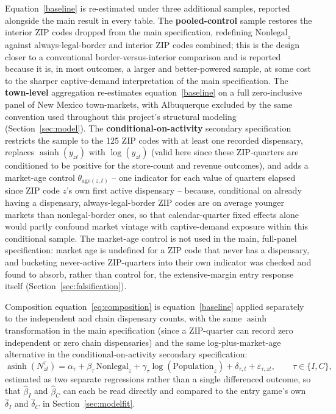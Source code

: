 \documentclass[english,12pt]{article}
\begin{document}
Equation~\eqref{baseline} is re-estimated under three additional samples, reported alongside the main result in every table. The \textbf{pooled-control} sample restores the interior ZIP codes dropped from the main specification, redefining $\text{Nonlegal}_z$ against always-legal-border and interior ZIP codes combined; this is the design closer to a conventional border-versus-interior comparison and is reported because it is, in most outcomes, a larger and better-powered sample, at some cost to the sharper captive-demand interpretation of the main specification. The \textbf{town-level} aggregation re-estimates equation~\eqref{baseline} on a full zero-inclusive panel of New Mexico town-markets, with Albuquerque excluded by the same convention used throughout this project's structural modeling (Section~\ref{sec:model}). The \textbf{conditional-on-activity} secondary specification restricts the sample to the 125 ZIP codes with at least one recorded dispensary, replaces $\operatorname{asinh}(y_{zt})$ with $\log(y_{zt})$ (valid here since these ZIP-quarters are conditioned to be positive for the store-count and revenue outcomes), and adds a market-age control $\theta_{\text{age}(z,t)}$ -- one indicator for each value of quarters elapsed since ZIP code $z$'s own first active dispensary -- because, conditional on already having a dispensary, always-legal-border ZIP codes are on average younger markets than nonlegal-border ones, so that calendar-quarter fixed effects alone would partly confound market vintage with captive-demand exposure within this conditional sample. The market-age control is not used in the main, full-panel specification: market age is undefined for a ZIP code that never has a dispensary, and bucketing never-active ZIP-quarters into their own indicator was checked and found to absorb, rather than control for, the extensive-margin entry response itself (Section~\ref{sec:falsification}).

Composition equation~\eqref{eq:composition} is equation~\eqref{baseline} applied separately to the independent and chain dispensary counts, with the same $\operatorname{asinh}$ transformation in the main specification (since a ZIP-quarter can record zero independent or zero chain dispensaries) and the same log-plus-market-age alternative in the conditional-on-activity secondary specification:
\begin{equation}
\label{eq:composition}
\operatorname{asinh}(N^\tau_{zt})=\alpha_\tau
+
\beta_\tau\, \text{Nonlegal}_z
+
\gamma_\tau \log(\text{Population}_z)
+
\delta_{\tau,t}
+
\varepsilon_{\tau,zt}, \qquad \tau \in \{I, C\},
\end{equation}
estimated as two separate regressions rather than a single differenced outcome, so that $\hat\beta_I$ and $\hat\beta_C$ can each be read directly and compared to the entry game's own $\hat\delta_I$ and $\hat\delta_C$ in Section~\ref{sec:modelfit}.
\end{document}
